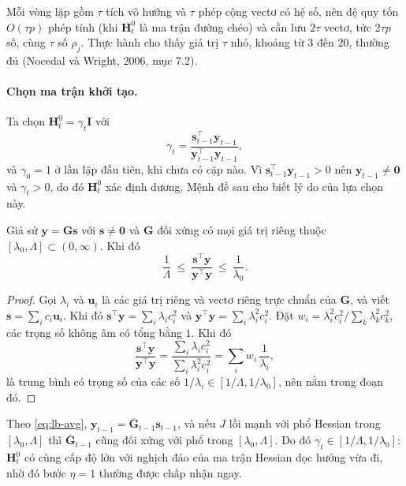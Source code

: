 Mỗi vòng lặp gồm $\tau$ tích vô hướng và $\tau$ phép cộng vectơ có hệ số, nên đệ quy tốn $O(\tau p)$ phép tính (khi $\mathbf{H}_t^{0}$ là ma trận đường chéo) và cần lưu $2\tau$ vectơ, tức $2\tau p$ số, cùng $\tau$ số $\rho_j$. Thực hành cho thấy giá trị $\tau$ nhỏ, khoảng từ $3$ đến $20$, thường đủ (Nocedal và Wright, 2006, mục 7.2).

\paragraph{Chọn ma trận khởi tạo.}
Ta chọn $\mathbf{H}_t^{0}=\gamma_t\mathbf{I}$ với
\begin{equation}\label{eq:lb-gamma}
  \gamma_t=\frac{\mathbf{s}_{t-1}^{\top}\mathbf{y}_{t-1}}{\mathbf{y}_{t-1}^{\top}\mathbf{y}_{t-1}},
\end{equation}
và $\gamma_0=1$ ở lần lặp đầu tiên, khi chưa có cặp nào. Vì $\mathbf{s}_{t-1}^{\top}\mathbf{y}_{t-1}>0$ nên $\mathbf{y}_{t-1}\neq\mathbf{0}$ và $\gamma_t>0$, do đó $\mathbf{H}_t^{0}$ xác định dương. Mệnh đề sau cho biết lý do của lựa chọn này.

\begin{proposition}\label{prop:lb-gamma}
Giả sử $\mathbf{y}=\mathbf{G}\mathbf{s}$ với $\mathbf{s}\ne\mathbf{0}$ và $\mathbf{G}$ đối xứng có mọi giá trị riêng thuộc $[\lambda_0,\Lambda]\subset(0,\infty)$. Khi đó
\begin{equation*}
  \frac{1}{\Lambda}\ \le\ \frac{\mathbf{s}^{\top}\mathbf{y}}{\mathbf{y}^{\top}\mathbf{y}}\ \le\ \frac{1}{\lambda_0}.
\end{equation*}
\end{proposition}

\begin{proof}
Gọi $\lambda_i$ và $\mathbf{u}_i$ là các giá trị riêng và vectơ riêng trực chuẩn của $\mathbf{G}$, và viết $\mathbf{s}=\sum_ic_i\mathbf{u}_i$. Khi đó $\mathbf{s}^{\top}\mathbf{y}=\sum_i\lambda_ic_i^2$ và $\mathbf{y}^{\top}\mathbf{y}=\sum_i\lambda_i^2c_i^2$. Đặt $w_i=\lambda_i^2c_i^2/\sum_k\lambda_k^2c_k^2$, các trọng số không âm có tổng bằng $1$. Khi đó
\begin{equation*}
  \frac{\mathbf{s}^{\top}\mathbf{y}}{\mathbf{y}^{\top}\mathbf{y}}=\frac{\sum_i\lambda_ic_i^2}{\sum_i\lambda_i^2c_i^2}=\sum_iw_i\,\frac{1}{\lambda_i},
\end{equation*}
là trung bình có trọng số của các số $1/\lambda_i\in[1/\Lambda,1/\lambda_0]$, nên nằm trong đoạn đó.
\end{proof}

Theo \eqref{eq:lb-avg}, $\mathbf{y}_{t-1}=\bar{\mathbf{G}}_{t-1}\mathbf{s}_{t-1}$, và nếu $J$ lồi mạnh với phổ Hessian trong $[\lambda_0,\Lambda]$ thì $\bar{\mathbf{G}}_{t-1}$ cũng đối xứng với phổ trong $[\lambda_0,\Lambda]$. Do đó $\gamma_t\in[1/\Lambda,1/\lambda_0]$: $\mathbf{H}_t^{0}$ có cùng cấp độ lớn với nghịch đảo của ma trận Hessian dọc hướng vừa đi, nhờ đó bước $\eta=1$ thường được chấp nhận ngay.

